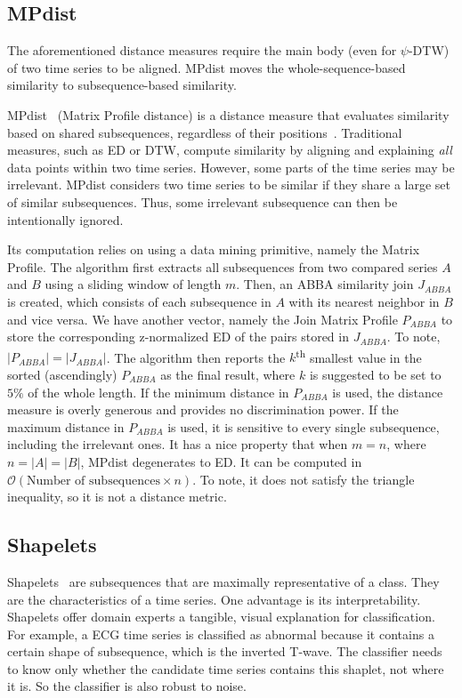 \subsection{MPdist} %

The aforementioned distance measures require the main body (even for $\psi$-DTW) of two time series to be aligned.
MPdist moves the whole-sequence-based similarity to subsequence-based similarity.

MPdist~\cite{gharghabi2018matrix} (Matrix Profile distance) is a distance measure that evaluates similarity based on shared subsequences, regardless of their positions~\cite{gharghabi2018matrix}.
Traditional measures, such as ED or DTW, compute similarity by aligning and explaining \textit{all} data points within two time series.
However, some parts of the time series may be irrelevant.
MPdist considers two time series to be similar if they share a large set of similar subsequences.
Thus, some irrelevant subsequence can then be intentionally ignored.

Its computation relies on using a data mining primitive, namely the Matrix Profile.
The algorithm first extracts all subsequences from two compared series $A$ and $B$ using a sliding window of length $m$.
Then, an ABBA similarity join $J_{ABBA}$ is created, which consists of each subsequence in $A$ with its nearest neighbor in $B$ and vice versa.
We have another vector, namely the Join Matrix Profile $P_{ABBA}$ to store the corresponding z-normalized ED of the pairs stored in  $J_{ABBA}$.
To note, $|P_{ABBA}| = |J_{ABBA}|$.
The algorithm then reports the $k$\textsuperscript{th} smallest value in the sorted (ascendingly) $P_{ABBA}$ as the final result, where $k$ is suggested to be set to $5\%$ of the whole length.
If the minimum distance in $P_{ABBA}$ is used, the distance measure is overly generous and provides no discrimination power.
If the maximum distance in $P_{ABBA}$ is used, it is sensitive to every single subsequence, including the irrelevant ones.
It has a nice property that when $m = n$, where $n = |A| = |B|$, MPdist degenerates to ED.
It can be computed in $\mathcal{O}(\text{Number of subsequences} \times n)$.
To note, it does not satisfy the triangle inequality, so it is not a distance metric.

\subsection{Shapelets} %

Shapelets~\cite{ye2009time} are subsequences that are maximally representative of a class.
They are the characteristics of a time series.
One advantage is its interpretability.
Shapelets offer domain experts a tangible, visual explanation for classification.
For example, a ECG time series is classified as abnormal because it contains a certain shape of subsequence, which is the inverted T-wave.
The classifier needs to know only whether the candidate time series contains this shaplet, not where it is.
So the classifier is also robust to noise. 

